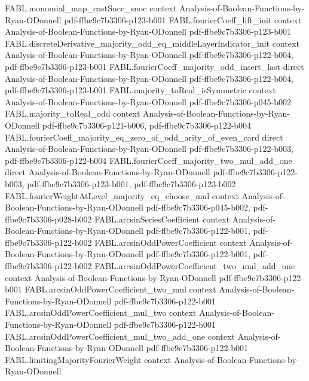 \begin{theorem}
\proofstep
  {FABL.monomial_map_castSucc_snoc}
  {context}
  {Analysis-of-Boolean-Functions-by-Ryan-ODonnell}
  {pdf-ffbe9c7b3306-p123-b001}
\proofstep
  {FABL.fourierCoeff_lift_init}
  {context}
  {Analysis-of-Boolean-Functions-by-Ryan-ODonnell}
  {pdf-ffbe9c7b3306-p123-b001}
\proofstep
  {FABL.discreteDerivative_majority_odd_eq_middleLayerIndicator_init}
  {context}
  {Analysis-of-Boolean-Functions-by-Ryan-ODonnell}
  {pdf-ffbe9c7b3306-p122-b004,
    pdf-ffbe9c7b3306-p123-b001}
\proofstep
  {FABL.fourierCoeff_majority_odd_insert_last}
  {direct}
  {Analysis-of-Boolean-Functions-by-Ryan-ODonnell}
  {pdf-ffbe9c7b3306-p122-b004,
    pdf-ffbe9c7b3306-p123-b001}
\proofstep
  {FABL.majority_toReal_isSymmetric}
  {context}
  {Analysis-of-Boolean-Functions-by-Ryan-ODonnell}
  {pdf-ffbe9c7b3306-p045-b002}
\proofstep
  {FABL.majority_toReal_odd}
  {context}
  {Analysis-of-Boolean-Functions-by-Ryan-ODonnell}
  {pdf-ffbe9c7b3306-p121-b006,
    pdf-ffbe9c7b3306-p122-b004}
\proofstep
  {FABL.fourierCoeff_majority_eq_zero_of_odd_arity_of_even_card}
  {direct}
  {Analysis-of-Boolean-Functions-by-Ryan-ODonnell}
  {pdf-ffbe9c7b3306-p122-b003,
    pdf-ffbe9c7b3306-p122-b004}
\proofstep
  {FABL.fourierCoeff_majority_two_mul_add_one}
  {direct}
  {Analysis-of-Boolean-Functions-by-Ryan-ODonnell}
  {pdf-ffbe9c7b3306-p122-b003,
    pdf-ffbe9c7b3306-p123-b001,
    pdf-ffbe9c7b3306-p123-b002}
\proofstep
  {FABL.fourierWeightAtLevel_majority_eq_choose_mul}
  {context}
  {Analysis-of-Boolean-Functions-by-Ryan-ODonnell}
  {pdf-ffbe9c7b3306-p045-b002,
    pdf-ffbe9c7b3306-p028-b002}
\proofstep
  {FABL.arcsinSeriesCoefficient}
  {context}
  {Analysis-of-Boolean-Functions-by-Ryan-ODonnell}
  {pdf-ffbe9c7b3306-p122-b001,
    pdf-ffbe9c7b3306-p122-b002}
\proofstep
  {FABL.arcsinOddPowerCoefficient}
  {context}
  {Analysis-of-Boolean-Functions-by-Ryan-ODonnell}
  {pdf-ffbe9c7b3306-p122-b001,
    pdf-ffbe9c7b3306-p122-b002}
\proofstep
  {FABL.arcsinOddPowerCoefficient_two_mul_add_one}
  {context}
  {Analysis-of-Boolean-Functions-by-Ryan-ODonnell}
  {pdf-ffbe9c7b3306-p122-b001}
\proofstep
  {FABL.arcsinOddPowerCoefficient_two_mul}
  {context}
  {Analysis-of-Boolean-Functions-by-Ryan-ODonnell}
  {pdf-ffbe9c7b3306-p122-b001}
\proofstep
  {FABL.arcsinOddPowerCoefficient_mul_two}
  {context}
  {Analysis-of-Boolean-Functions-by-Ryan-ODonnell}
  {pdf-ffbe9c7b3306-p122-b001}
\proofstep
  {FABL.arcsinOddPowerCoefficient_mul_two_add_one}
  {context}
  {Analysis-of-Boolean-Functions-by-Ryan-ODonnell}
  {pdf-ffbe9c7b3306-p122-b001}
\proofstep
  {FABL.limitingMajorityFourierWeight}
  {context}
  {Analysis-of-Boolean-Functions-by-Ryan-ODonnell}

\end{theorem}
